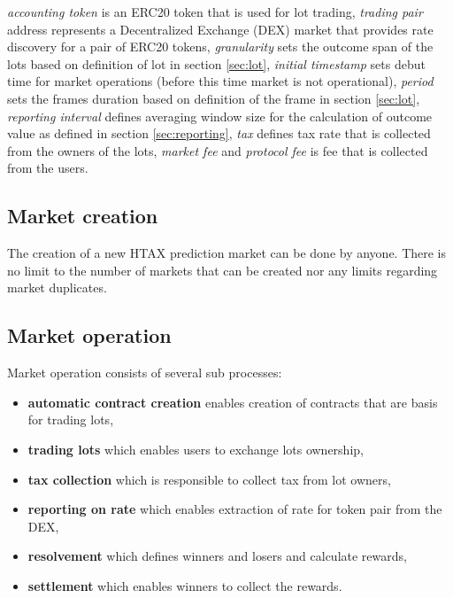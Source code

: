 \documentclass{article}
\begin{document}
	\textit{accounting token} is an ERC20 token that is used for lot trading, \textit{trading pair} address represents a Decentralized Exchange (DEX) market that provides rate discovery for a pair of ERC20 tokens, \textit{granularity} sets the outcome span of the lots based on definition of lot in section \ref{sec:lot}, \textit{initial timestamp} sets debut time for market operations (before this time market is not operational), \textit{period} sets the frames duration based on definition of the frame in section \ref{sec:lot}, \textit{reporting interval} defines averaging window size for the calculation of outcome value as defined in section \ref{sec:reporting}, \textit{tax} defines tax rate that is collected from the owners of the lots, \textit{market fee} and \textit{protocol fee} is fee that is collected from the users. 
	
	\subsection{Market creation} \label{sec:marketCreation} 
	
	The creation of a new HTAX prediction market can be done by anyone. There is no limit to the number of markets that can be created nor any limits regarding market duplicates. 
	
	
	\subsection{Market operation}
	
	Market operation consists of several sub processes:
	
	\begin{itemize}
		\item \textbf{automatic contract creation} enables creation of contracts that are basis for trading lots,
		\item \textbf{trading lots} which enables users to exchange lots ownership,
		\item \textbf{tax collection} which is responsible to collect tax from lot owners,
		\item \textbf{reporting on rate} which enables extraction of rate for token pair from the DEX,
		\item \textbf{resolvement} which defines winners and losers and calculate rewards,
		\item \textbf{settlement} which enables winners to collect the rewards.
	\end{itemize}	
	
\end{document}
